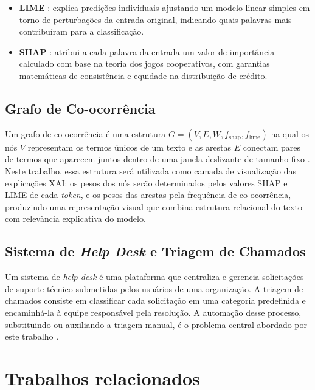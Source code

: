 \documentclass[
    12pt,                %
    openright,           %
    oneside,             %
    a4paper,             %
    english,             %
    brazil               %
]{abntex2}
\begin{document}
\begin{itemize}
    \item \textbf{LIME} \cite{ribeiro2016}: explica predições individuais ajustando um modelo linear simples em torno de perturbações da entrada original, indicando quais palavras mais contribuíram para a classificação.
 
    \item \textbf{SHAP} \cite{lundberg2017}: atribui a cada palavra da entrada um valor de importância calculado com base na teoria dos jogos cooperativos, com garantias matemáticas de consistência e equidade na distribuição de crédito.
\end{itemize}
 
\subsection{Grafo de Co-ocorrência}
 
Um grafo de co-ocorrência é uma estrutura $G = (V, E, W, f_{\text{shap}}, f_{\text{lime}})$ na qual os nós $V$ representam os termos únicos de um texto e as arestas $E$ conectam pares de termos que aparecem juntos dentro de uma janela deslizante de tamanho fixo \cite{yao2019}. Neste trabalho, essa estrutura será utilizada como camada de visualização das explicações XAI: os pesos dos nós serão determinados pelos valores SHAP e LIME de cada \textit{token}, e os pesos das arestas pela frequência de co-ocorrência, produzindo uma representação visual que combina estrutura relacional do texto com relevância explicativa do modelo.
 
\subsection{Sistema de \textit{Help Desk} e Triagem de Chamados}
 
Um sistema de \textit{help desk} é uma plataforma que centraliza e gerencia solicitações de suporte técnico submetidas pelos usuários de uma organização. A triagem de chamados consiste em classificar cada solicitação em uma categoria predefinida e encaminhá-la à equipe responsável pela resolução. A automação desse processo, substituindo ou auxiliando a triagem manual, é o problema central abordado por este trabalho \cite{zemp2021}.

\section{Trabalhos relacionados}
\label{sec:trabalhos_relacionados}
\end{document}
